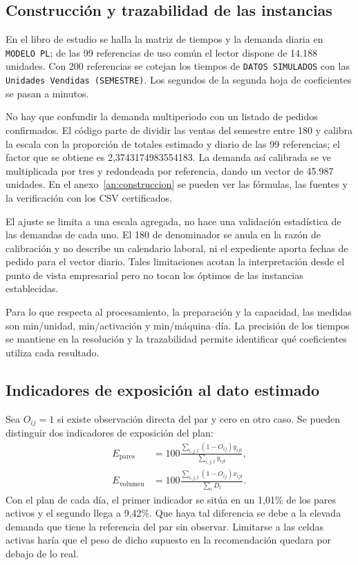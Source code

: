 \subsection{Construcción y trazabilidad de las instancias}
En el libro de estudio se halla la matriz de tiempos y la demanda diaria en \texttt{MODELO PL}; de las 99 referencias de uso común el lector dispone de 14.188 unidades. Con 200 referencias se cotejan los tiempos de \texttt{DATOS SIMULADOS} con las \texttt{Unidades Vendidas (SEMESTRE)}. Los segundos de la segunda hoja de coeficientes se pasan a minutos.

No hay que confundir la demanda multiperiodo con un listado de pedidos confirmados. El código parte de dividir las ventas del semestre entre 180 y calibra la escala con la proporción de totales estimado y diario de las 99 referencias; el factor que se obtiene es 2,3743174983554183. La demanda así calibrada se ve multiplicada por tres y redondeada por referencia, dando un vector de 45.987 unidades. En el anexo~\ref{an:construccion} se pueden ver las fórmulas, las fuentes y la verificación con los CSV certificados.

El ajuste se limita a una escala agregada, no hace una validación estadística de las demandas de cada uno. El 180 de denominador se anula en la razón de calibración y no describe un calendario laboral, ni el expediente aporta fechas de pedido para el vector diario. Tales limitaciones acotan la interpretación desde el punto de vista empresarial pero no tocan los óptimos de las instancias establecidas.

Para lo que respecta al procesamiento, la preparación y la capacidad, las medidas son min/unidad, min/activación y min/máquina--día. La precisión de los tiempos se mantiene en la resolución y la trazabilidad permite identificar qué coeficientes utiliza cada resultado.

\subsection{Indicadores de exposición al dato estimado}
Sea $O_{ij}=1$ si existe observación directa del par y cero en otro caso. Se pueden distinguir dos indicadores de exposición del plan:
\begin{align}
E_{\mathrm{pares}}&=100\frac{\sum_{i,j,t}(1-O_{ij})y_{ijt}}{\sum_{i,j,t}y_{ijt}},\\
E_{\mathrm{volumen}}&=100\frac{\sum_{i,j,t}(1-O_{ij})x_{ijt}}{\sum_iD_i}.
\end{align}
Con el plan de cada día, el primer indicador se sitúa en un 1,01\% de los pares activos y el segundo llega a 9,42\%. Que haya tal diferencia se debe a la elevada demanda que tiene la referencia del par sin observar. Limitarse a las celdas activas haría que el peso de dicho supuesto en la recomendación quedara por debajo de lo real.

